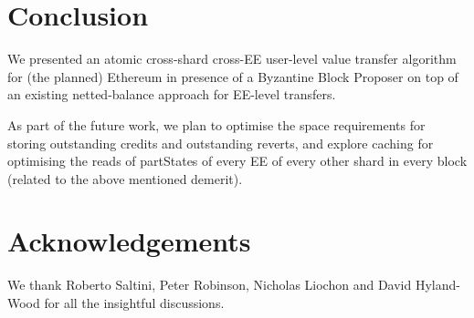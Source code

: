 \documentclass{IEEEtran}
\begin{document}
\section{Conclusion}
We presented an atomic cross-shard cross-EE user-level value transfer algorithm for (the planned) Ethereum in presence of a Byzantine Block Proposer on top of an existing netted-balance approach for EE-level transfers. 

As part of the future work, we plan to optimise the space requirements for storing outstanding credits and outstanding reverts, and explore caching for optimising the reads of partStates of every EE of every other shard in every block (related to the above mentioned demerit).

\section*{Acknowledgements}
We thank Roberto Saltini, Peter Robinson, Nicholas Liochon and David Hyland-Wood for all the insightful discussions.



\end{document}
